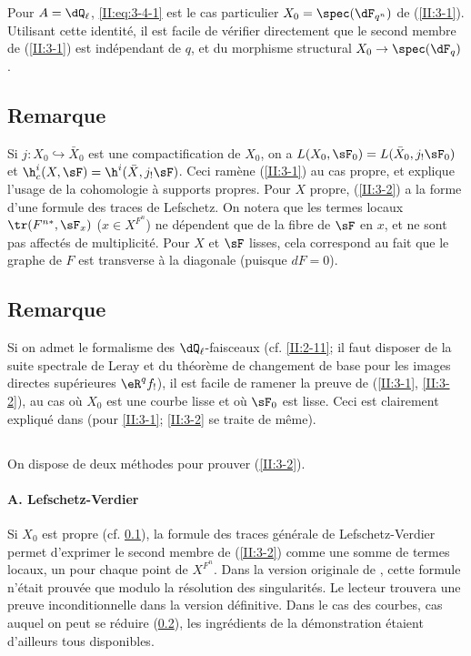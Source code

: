 Pour $A=\dQ_\ell$, \eqref{II:eq:3-4-1} est le cas particulier 
$X_0=\spec(\dF_{q^n})$ de (\ref{II:3-1}). Utilisant cette identité, il est 
facile de vérifier directement que le second membre de (\ref{II:3-1}) est 
indépendant de $q$, et du morphisme structural $X_0\to\spec(\dF_q)$. 





\subsection{Remarque}\label{II:3-6}

Si $j:X_0\hookrightarrow \bar X_0$ est une compactification de $X_0$, on a 
$L(X_0,\sF_0) = L(\bar X_0, j_!\sF_0)$ et 
$\h_c^i(X,\sF) = \h^i(\bar X,j_!\sF)$. Ceci ramène (\ref{II:3-1}) au cas 
propre, et explique l'usage de la cohomologie à supports propres. Pour $X$ 
propre, (\ref{II:3-2}) a la forme d'une formule des traces de Lefschetz. On 
notera que les termes locaux $\tr(F^{n *},\sF_x)$ ($x\in X^{F^n}$) ne 
dépendent que de la fibre de $\sF$ en $x$, et ne sont pas affectés de 
multiplicité. Pour $X$ et $\sF$ lisses, cela correspond au fait que le graphe 
de $F$ est transverse à la diagonale (puisque $d F = 0$). 





\subsection{Remarque}\label{II:3-7}

Si on admet le formalisme des $\dQ_\ell$-faisceaux (cf. \ref{II:2-11}; il faut 
disposer de la suite spectrale de Leray et du théorème de changement de 
base pour les images directes supérieures $\eR^q f_!$), il est facile de 
ramener la preuve de (\ref{II:3-1}, \ref{II:3-2}), au cas où $X_0$ est 
une courbe lisse et où $\sF_0$ est lisse. Ceci est clairement expliqué 
dans  (pour \ref{II:3-1}; \ref{II:3-2} se traite de même). 





\subsection{}\label{II:3-8}

On dispose de deux méthodes pour prouver (\ref{II:3-2}). 


\paragraph{A. Lefschetz-Verdier}
Si $X_0$ est propre (cf. \ref{II:3-6}), la formule des traces générale de 
Lefschetz-Verdier permet d'exprimer le second membre de (\ref{II:3-2}) comme 
une somme de termes locaux, un pour chaque point de $X^{F^n}$. Dans la version 
originale de , cette formule n'était prouvée que modulo la 
résolution des singularités. Le lecteur trouvera une preuve inconditionnelle 
dans la version définitive. Dans le cas des courbes, cas auquel on peut se 
réduire (\ref{II:3-7}), les ingrédients de la démonstration étaient 
d'ailleurs tous disponibles. 

